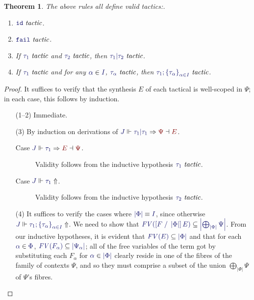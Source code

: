 \documentclass[11pt]{article}
\newtheorem{thm}{Theorem}[section]
\theoremstyle{definition}
\theoremstyle{remark}
\numberwithin{equation}{section}
\def\InputModeColorName{MidnightBlue}
\def\OutputModeColorName{Maroon}
\newcommand\InputMode[1]{{\color{\InputModeColorName}{#1}}}
\newcommand\OutputMode[1]{{\color{\OutputModeColorName}{#1}}}
\newcommand\JJ{J}
\newcommand\IsTac[1]{\InputMode{#1}\ \textit{tactic}}
\newcommand\MkSet[1]{\left\{#1\right\}}
\newcommand\MkFam[3]{\MkSet{#1_{#2}}_{#2\in #3}}
\newcommand\Refine[4]{\InputMode{#1}\Vdash\InputMode{#2}\Rightarrow\OutputMode{#4}\dashv\OutputMode{#3}}
\newcommand\NoRefine[2]{\InputMode{#1}\Vdash\InputMode{#2}\Uparrow}
\newcommand\Member[2]{\InputMode{#1}\in\InputMode{#2}}
\newcommand\IdTac{\mathtt{id}}
\newcommand\FailTac{\mathtt{fail}}
\newcommand\OrElseTac[2]{#1\vert#2}
\newcommand\ThenTac[2]{#1;#2}
\newcommand\Dom[1]{\left\vert#1\right\vert}
\newcommand\SubsetEq[2]{\InputMode{#1}\subseteq\InputMode{#2}}
\newcommand\FV[1]{\textit{FV}\left(#1\right)}
\newcommand\Subst[3]{\left[#1\;/\;#2\right]#3}
\newcommand\IsEquiv[2]{\InputMode{#1}\equiv\InputMode{#2}}
\begin{document}
\begin{thm}
  The above rules all define valid tactics:.
  \begin{enumerate}
    \item $\IsTac{\IdTac}$.
    \item $\IsTac{\FailTac}$.
    \item If $\IsTac{\tau_1}$ and $\IsTac{\tau_2}$, then
      $\IsTac{\OrElseTac{\tau_1}{\tau_2}}$.

    \item If $\IsTac{\tau_1}$ and for any $\Member{\alpha}{I}$,
      $\IsTac{\tau_\alpha}$, then
      $\IsTac{\ThenTac{\tau_1}{\MkFam{\tau}{\alpha}{I}}}$.

  \end{enumerate}
\end{thm}
\begin{proof}
  It suffices to verify that the synthesis $E$ of each tactical is well-scoped
  in $\Psi$; in each case, this follows by induction.
  \begin{enumerate}
    \item[(1--2)] Immediate.
    \item[(3)]
      By induction on derivations of
      $\Refine{\JJ}{\OrElseTac{\tau_1}{\tau_1}}{E}{\Psi}$.
      \begin{description}
        \item[Case $\Refine{\JJ}{\tau_1}{\Psi}{E}$.] Validity follows from the
          inductive hypothesis $\IsTac{\tau_1}$.
        \item[Case $\NoRefine{\JJ}{\tau_1}$.] Validity follows from the
          inductive hypothesis $\IsTac{\tau_2}$.
      \end{description}

    \item[(4)] It suffices to verify the cases where
      $\IsEquiv{\Dom\Phi}{I}$, since otherwise
      $\NoRefine{\JJ}{\ThenTac{\tau_1}{\MkFam{\tau}{\alpha}{I}}}$.
      We need to show that
      $\SubsetEq{\FV{\Subst{F}{\Dom\Phi}{E}}}{\Dom{\bigoplus_{\Dom\Phi}\Psi}}$.
      From our inductive hypotheses, it is evident that
      $\SubsetEq{\FV{E}}{\Dom\Phi}$ and that for each $\Member{\alpha}{\Phi}$,
      $\SubsetEq{\FV{F_\alpha}}{\Dom{\Psi_\alpha}}$; all of the free variables
      of the term got by substituting each $F_\alpha$ for
      $\Member{\alpha}{\Dom\Phi}$ clearly reside in one of the fibres of the
      family of contexts $\Psi$, and so they must comprise a subset of the
      union $\bigoplus_{\Dom\Phi}\Psi$ of $\Psi$'s fibres.

  \end{enumerate}
\end{proof}
\end{document}
